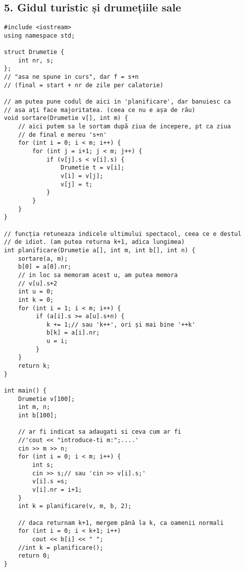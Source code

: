 \documentclass[11pt]{article}
\begin{document}
\subsection*{5. Gidul turistic și drumețiile sale}
\label{sec:orge748864}
\begin{verbatim}
#include <iostream>
using namespace std;

struct Drumetie {
    int nr, s;
};
// "asa ne spune in curs", dar f = s+n
// (final = start + nr de zile per calatorie)

// am putea pune codul de aici in 'planificare', dar banuiesc ca
// asa ați face majoritatea. (ceea ce nu e așa de rău)
void sortare(Drumetie v[], int m) {
    // aici putem sa le sortam după ziua de incepere, pt ca ziua
    // de final e mereu 's+n'
    for (int i = 0; i < m; i++) {
        for (int j = i+1; j < m; j++) {
            if (v[j].s < v[i].s) {
                Drumetie t = v[i];
                v[i] = v[j];
                v[j] = t;
            }
        }
    }
}

// funcția retuneaza indicele ultimului spectacol, ceea ce e destul
// de idiot. (am putea returna k+1, adica lungimea)
int planificare(Drumetie a[], int m, int b[], int n) {
    sortare(a, m);
    b[0] = a[0].nr;
    // in loc sa memoram acest u, am putea memora
    // v[u].s+2
    int u = 0;
    int k = 0;
    for (int i = 1; i < m; i++) {
         if (a[i].s >= a[u].s+n) {
            k += 1;// sau 'k++', ori și mai bine '++k'
            b[k] = a[i].nr;
            u = i;
         }
    }
    return k;
}

int main() {
    Drumetie v[100];
    int m, n;
    int b[100];

    // ar fi indicat sa adaugati si ceva cum ar fi
    //'cout << "introduce-ti m:";....'
    cin >> m >> n;
    for (int i = 0; i < m; i++) {
        int s;
        cin >> s;// sau 'cin >> v[i].s;'
        v[i].s =s;
        v[i].nr = i+1;
    }
    int k = planificare(v, m, b, 2);

    // daca returnam k+1, mergem până la k, ca oamenii normali
    for (int i = 0; i < k+1; i++)
        cout << b[i] << " ";
    //int k = planificare();
    return 0;
}

\end{verbatim}
\end{document}
